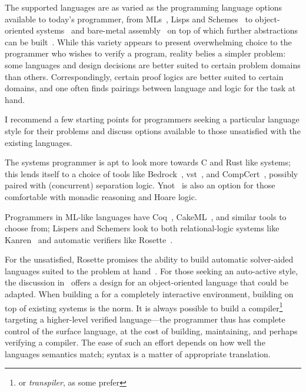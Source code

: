 The supported languages are as varied as the programming language options
available to today's programmer, from MLs~\cite{Coq,Kumar_2014}, Lisps and
Schemes~\cite{Torlak_2013} to object-oriented
systems~\cite{leino2008specification,leino2010dafny} and bare-metal
assembly~\cite{Chlipala_2011} on top of which further abstractions can be
built~\cite{Chlipala_2015}. While this variety appears to present overwhelming
choice to the programmer who wishes to verify a program, reality belies a
simpler problem: some languages and design decisions are better suited to
certain problem domains than others. Correspondingly, certain proof logics are
better suited to certain domains, and one often finds pairings between language
and logic for the task at hand.

I recommend a few starting points for programmers seeking a particular language
style for their problems and discuss options available to those unsatisfied with
the existing languages.

The systems programmer is apt to look more towards C and Rust like systems; this
lends itself to a choice of tools like Bedrock~\cite{Chlipala_2011},
\gls{vst}~\cite{VST}, and CompCert~\cite{Kastner-LBSSF-2017}, possibly paired
with (concurrent) separation logic. Ynot~\cite{Nanevski08ynot:reasoning} is also
an option for those comfortable with monadic reasoning and Hoare logic.

Programmers in ML-like languages have Coq~\cite{Coq}, CakeML~\cite{Kumar_2014},
and similar tools to choose from; Lispers and Schemers look to both
relational-logic systems like Kanren~\cite{Byrd_2009} and automatic verifiers
like Rosette~\cite{Rosette}.

For the unsatisfied, Rosette promises the ability to build automatic
solver-aided languages suited to the problem at hand~\cite{Torlak_2013}. For
those seeking an auto-active style, the discussion
in~\cite{leino2008specification} offers a design for an object-oriented language
that could be adapted. When building a for a completely interactive environment,
building on top of existing systems is the norm. It is always possible to build
a compiler\footnote{or \emph{transpiler}, as some prefer} targeting a
higher-level verified language---the programmer thus has complete control of the
surface language, at the cost of building, maintaining, and perhaps verifying a
compiler. The ease of such an effort depends on how well the languages semantics
match; syntax is a matter of appropriate translation.
